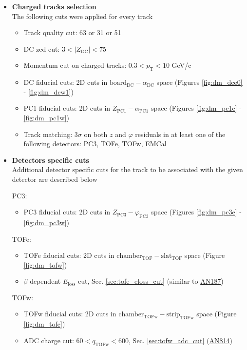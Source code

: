 \begin{description}
\begin{itemize}
            \item \textbf{Charged tracks selection} \\					
					\label{text:track_selection}
					The following cuts were applied for every track
					\begin{itemize}
						\item Track quality cut: 63 or 31 or 51
                  \item DC zed cut: $3 < \lvert Z_{\text{DC}} \rvert < 75$
                  \item Momentum cut on charged tracks: $0.3 < p_\text{T} < 10$ GeV/c
                  \item DC fiducial cuts: 2D cuts in $\text{board}_{\text{DC}} - \alpha_{\text{DC}}$ space (Figures \ref{fig:dm_dce0} - \ref{fig:dm_dcw1})
                  \item PC1 fiducial cuts: 2D cuts in $Z_{\text{PC1}} - \alpha_{\text{PC1}}$ space (Figures \ref{fig:dm_pc1e} - \ref{fig:dm_pc1w})
						\item Track matching: $3\sigma$ on both $z$ and $\varphi$ residuals in at least one of the following detectors: PC3, TOFe, TOFw, EMCal
					\end{itemize}

            \item \textbf{Detectors specific cuts} \\					
					Additional detector specific cuts for the track to be associated with the given detector are described below

					PC3:
					\begin{itemize}
                  \item PC3 fiducial cuts: 2D cuts in $Z_{\text{PC3}} - \varphi_{\text{PC3}}$ space (Figures \ref{fig:dm_pc3e} - \ref{fig:dm_pc3w})
					\end{itemize}
					
					TOFe:
					\begin{itemize}
                  \item TOFe fiducial cuts: 2D cuts in $\text{chamber}_{\text{TOF}} - \text{slat}_{\text{TOF}}$ space (Figure \ref{fig:dm_tofw})
                  \item $\beta$ dependent $E_{\text{loss}}$ cut, Sec. \ref{sec:tofe_eloss_cut} (similar to \href{https://phenix-intra.sdcc.bnl.gov/phenix/WWW/p/draft/chujo/PPG026/AnalysisNote/}{AN187})
					\end{itemize}

					TOFw:
					\begin{itemize}
                  \item TOFw fiducial cuts: 2D cuts in $\text{chamber}_{\text{TOFw}} - \text{strip}_{\text{TOFw}}$ space (Figure \ref{fig:dm_tofe})
                  \item ADC charge cut: $60 < q_{\text{TOFw}} < 600$, Sec. \ref{sec:tofw_adc_cut} (\href{https://phenix-intra.sdcc.bnl.gov/phenix/WWW/p/draft/belmonrj/AnalysisNotes/ananoterun7.pdf}{AN814})
					\end{itemize}


\end{itemize}
\end{description}
